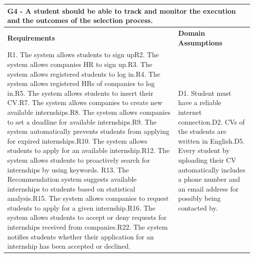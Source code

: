 \documentclass{article}
\begin{document}
\begin{table}[H]
    \centering
    \begin{tabular}{|p{}|p{}|}
        \hline
        \multicolumn{2}{|p{10cm}|}{\textbf{G4} - A student should be able to track and monitor the execution and the outcomes of the selection process.} \\
        \hline
        \textbf{Requirements} & \textbf{Domain Assumptions} \\
        \hline
         R1. The system allows students to sign up\newline R2. The system allows companies HR to sign up.\newline R3. The system allows registered students to log in.\newline R4. The system allows registered HRs of companies to log in.\newline R5. The system allows students to insert their CV.\newline R7. The system allows companies to create new available internships.\newline R8. The system allows companies to set a deadline for available internships.\newline R9. The system automatically prevents students from applying for expired
internships.\newline R10. The system allows students to apply for an available internship.\newline R12. The system allows students to proactively search for internships by
using keywords. \newline R13. The Recommendation system suggests available internships to students
based on statistical analysis.\newline R15. The system allows companies to request students to apply for a given
internship.\newline R16. The system allows students to accept or deny requests for internships
received from companies.\newline R22. The system notifies students whether their application for an internship has been accepted or declined.\newline & D1. Student must have a reliable internet connection.\newline D2. CVs of the students are written in English.\newline D5. Every student by uploading their CV automatically includes a phone number and an email address for possibly being contacted by. \newline
\\
\hline
    \end{tabular}
\end{table}
\end{document}
